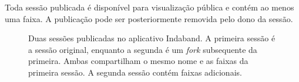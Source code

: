 Toda sessão publicada é disponível para visualização pública e contém ao menos
uma faixa. A publicação pode ser posteriormente removida pelo dono da sessão.


\begin{figure}[h]
  \begin{center}
    \caption{Duas sessões publicadas no aplicativo Indaband. A primeira sessão é
    a sessão original, enquanto a segunda é um \textit{fork} subsequente da
    primeira. Ambas compartilham o mesmo nome e as faixas da primeira sessão. A
    segunda sessão contém faixas adicionais.}
    \label{fig:session_and_fork}
  \end{center}
  \end{figure}

